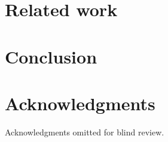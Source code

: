 \documentclass{sigchi}
\begin{document}
\section{Related work}

\section{Conclusion}

\section{Acknowledgments}
Acknowledgments omitted for blind review.

\balance








\end{document}
